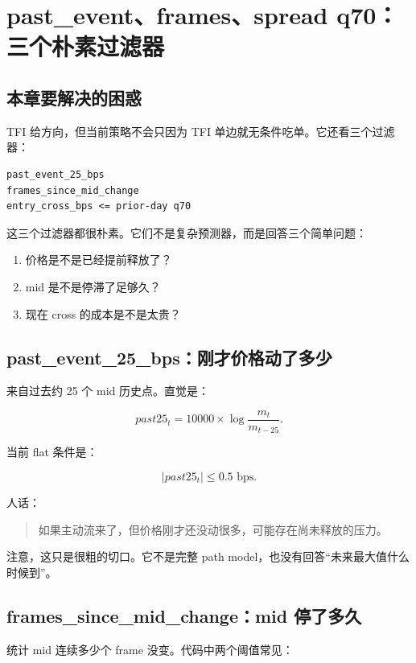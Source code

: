\chapter{past\_event、frames、spread q70：三个朴素过滤器}

\section{本章要解决的困惑}

TFI 给方向，但当前策略不会只因为 TFI 单边就无条件吃单。它还看三个过滤器：

\begin{lstlisting}
past_event_25_bps
frames_since_mid_change
entry_cross_bps <= prior-day q70
\end{lstlisting}

这三个过滤器都很朴素。它们不是复杂预测器，而是回答三个简单问题：

\begin{enumerate}[leftmargin=2em]
  \item 价格是不是已经提前释放了？
  \item mid 是不是停滞了足够久？
  \item 现在 cross 的成本是不是太贵？
\end{enumerate}

\section{past\_event\_25\_bps：刚才价格动了多少}

 来自过去约 25 个 mid 历史点。直觉是：

\[
past25_t = 10000 \times \log\frac{m_t}{m_{t-25}}.
\]

当前 flat 条件是：

\[
|past25_t| \le 0.5 \text{ bps}.
\]

人话：

\begin{quote}
如果主动流来了，但价格刚才还没动很多，可能存在尚未释放的压力。
\end{quote}

注意，这只是很粗的切口。它不是完整 path model，也没有回答“未来最大值什么时候到”。

\section{frames\_since\_mid\_change：mid 停了多久}

 统计 mid 连续多少个 frame 没变。代码中两个阈值常见：

